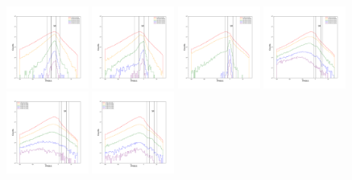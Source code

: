 \documentclass[12pt,prd]{article}
\begin{document}
\begin{figure}[h!]
\includegraphics[width=0.24\textwidth]{../figures/scanning_plotsgaiascan_l45_0_b82_2_ra201_5_dec28_5_npy_10.pdf}
\includegraphics[width=0.24\textwidth]{../figures/scanning_plotsgaiascan_l45_0_b82_2_ra201_5_dec28_5_npy_11.pdf}
\includegraphics[width=0.24\textwidth]{../figures/scanning_plotsgaiascan_l45_0_b82_2_ra201_5_dec28_5_npy_12.pdf}
\includegraphics[width=0.24\textwidth]{../figures/scanning_plotsgaiascan_l45_0_b82_2_ra201_5_dec28_5_npy_13.pdf}
\includegraphics[width=0.24\textwidth]{../figures/scanning_plotsgaiascan_l45_0_b82_2_ra201_5_dec28_5_npy_14.pdf}
\includegraphics[width=0.24\textwidth]{../figures/scanning_plotsgaiascan_l45_0_b82_2_ra201_5_dec28_5_npy_15.pdf}

\end{figure}
\end{document}
